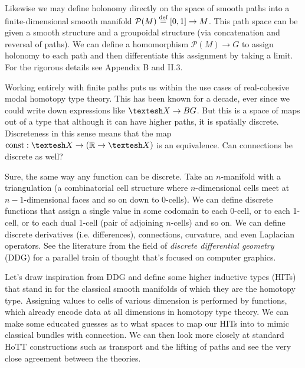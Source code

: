 \documentclass[12pt]{article}
\begin{document}
Likewise we may define holonomy directly on the space of smooth paths into a finite-dimensional smooth manifold \( \mathcal{P}(M)\stackrel{\textup{def}}{=} [0,1]\to M \). This path space can be given a smooth structure and a groupoidal structure (via concatenation and reversal of paths). We can define a homomorphism \( \mathcal{P}(M) \to G\) to assign holonomy to each path and then differentiate this assignment by taking a limit. For the rigorous details see \cite{freed1992classical} Appendix B and \cite{kobayashinomizu} II.3.

Working entirely with finite paths puts us within the use cases of real-cohesive modal homotopy type theory. This has been known for a decade, ever since we could write down expressions like \( \shape X\to BG \). But this is a space of maps out of a type that although it can have higher paths, it is spatially discrete. Discreteness in this sense means that the map \( \const:\shape X\to (\rr\to\shape X) \) is an equivalence. Can connections be discrete as well?

Sure, the same way any function can be discrete. Take an \( n \)-manifold with a triangulation (a combinatorial cell structure where \( n \)-dimensional cells meet at \( n-1 \)-dimensional faces and so on down to 0-cells). We can define discrete functions that assign a single value in some codomain to each 0-cell, or to each 1-cell, or to each dual 1-cell (pair of adjoining \( n \)-cells) and so on. We can define discrete derivatives (i.e. differences), connections, curvature, and even Laplacian operators. See the literature from the field of \emph{discrete differential geometry} (DDG) \cite{crane_connections} \cite{crane_ddg} for a parallel train of thought that's focused on computer graphics.

Let's draw inspiration from DDG and define some higher inductive types (HITs) that stand in for the classical smooth manifolds of which they are the homotopy type. Assigning values to cells of various dimension is performed by functions, which already encode data at all dimensions in homotopy type theory. We can make some educated guesses as to what spaces to map our HITs into to mimic classical bundles with connection. We can then look more closely at standard HoTT constructions such as transport and the lifting of paths and see the very close agreement between the theories.
\end{document}
